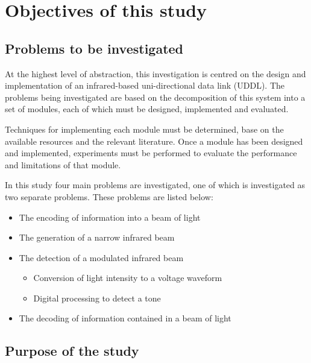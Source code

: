 \section{Objectives of this study}

\subsection{Problems to be investigated}

At the highest level of abstraction, this investigation is centred on the design and implementation of an infrared-based uni-directional data link (UDDL). The problems being investigated are based on the decomposition of this system into a set of modules, each of which must be designed, implemented and evaluated.

Techniques for implementing each module must be determined, base on the available resources and the relevant literature. Once a module has been designed and implemented, experiments must be performed to evaluate the performance and limitations of that module.

In this study four main problems are investigated, one of which is investigated as two separate problems. These problems are listed below:
\begin{itemize}
	\item The encoding of information into a beam of light
	\item The generation of a narrow infrared beam
	\item The detection of a modulated infrared beam
	\begin{itemize}
		\item Conversion of light intensity to a voltage waveform
		\item Digital processing to detect a tone
	\end{itemize}	
	\item The decoding of information contained in a beam of light
\end{itemize}






\subsection{Purpose of the study}

